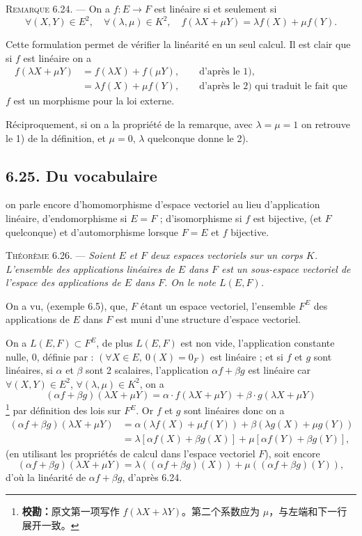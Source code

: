 \medskip\noindent\textsc{Remarque 6.24.} --- On a $f:E\longrightarrow F$ est linéaire si et seulement si
\[
\forall(X,Y)\in E^2,\quad\forall(\lambda,\mu)\in K^2,\quad f(\lambda X+\mu Y)=\lambda f(X)+\mu f(Y).
\]

Cette formulation permet de vérifier la linéarité en un seul calcul. Il est clair que si $f$ est linéaire on a
\begin{align*}
f(\lambda X+\mu Y)&=f(\lambda X)+f(\mu Y),\qquad\text{d'après le 1),}\\
&=\lambda f(X)+\mu f(Y),\qquad\text{d'après le 2) qui traduit le fait que}
\end{align*}
$f$ est un morphisme pour la loi externe.

Réciproquement, si on a la propriété de la remarque, avec $\lambda=\mu=1$ on retrouve le 1) de la définition, et $\mu=0$, $\lambda$ quelconque donne le 2).

\subsection*{6.25. Du vocabulaire}
on parle encore d'homomorphisme d'espace vectoriel au lieu d'application linéaire, d'endomorphisme si $E=F$ ; d'isomorphisme si $f$ est bijective, (et $F$ quelconque) et d'automorphisme lorsque $F=E$ et $f$ bijective.

\medskip\noindent\textsc{Théorème 6.26.} --- \emph{Soient $E$ et $F$ deux espaces vectoriels sur un corps $K$. L'ensemble des applications linéaires de $E$ dans $F$ est un sous-espace vectoriel de l'espace des applications de $E$ dans $F$. On le note $L(E,F)$.}

On a vu, (exemple 6.5), que, $F$ étant un espace vectoriel, l'ensemble $F^E$ des applications de $E$ dans $F$ est muni d'une structure d'espace vectoriel.

On a $L(E,F)\subset F^E$, de plus $L(E,F)$ est non vide, l'application constante nulle, 0, définie par : $(\forall X\in E,\ 0(X)=0_F)$ est linéaire ; et si $f$ et $g$ sont linéaires, si $\alpha$ et $\beta$ sont 2 scalaires, l'application $\alpha f+\beta g$ est linéaire car $\forall(X,Y)\in E^2$, $\forall(\lambda,\mu)\in K^2$, on a
\[
(\alpha f+\beta g)(\lambda X+\mu Y)=\alpha\cdot f(\lambda X+\mu Y)+\beta\cdot g(\lambda X+\mu Y)
\]
\footnote{\textbf{校勘：}原文第一项写作 $f(\lambda X+\lambda Y)$。第二个系数应为 $\mu$，与左端和下一行展开一致。}
par définition des lois sur $F^E$. Or $f$ et $g$ sont linéaires donc on a
\begin{align*}
(\alpha f+\beta g)(\lambda X+\mu Y)
&=\alpha(\lambda f(X)+\mu f(Y))+\beta(\lambda g(X)+\mu g(Y))\\
&=\lambda[\alpha f(X)+\beta g(X)]+\mu[\alpha f(Y)+\beta g(Y)],
\end{align*}
(en utilisant les propriétés de calcul dans l'espace vectoriel $F$), soit encore
\[
(\alpha f+\beta g)(\lambda X+\mu Y)=\lambda((\alpha f+\beta g)(X))+\mu((\alpha f+\beta g)(Y)),
\]
d'où la linéarité de $\alpha f+\beta g$, d'après 6.24.

